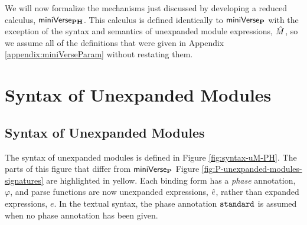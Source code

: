 {\else 

We will now formalize the mechanisms just discussed by developing a reduced calculus, $\mathsf{miniVerse}_\textbf{PH}$. This calculus is defined identically to $\mathsf{miniVerse}_\textbf{P}$ with the exception of the syntax and semantics of unexpanded module expressions, ${\hat M}$, so we assume all of the definitions that were given in Appendix \ref{appendix:miniVerseParam} without restating them. 

\fi

\ificfp
\section{Syntax of Unexpanded Modules}
\else
\subsection{Syntax of Unexpanded Modules}
\fi
The syntax of unexpanded modules is defined in Figure \ref{fig:syntax-uM-PH}. The parts of this figure that differ from \ificfp $\mathsf{miniVerse}_\textbf{P}$ \else Figure \ref{fig:P-unexpanded-modules-signatures} \fi are highlighted in yellow. Each binding form has a \emph{phase} annotation, $\varphi$, and parse functions are now unexpanded expressions, ${\hat e}$, rather than expanded expressions, $e$. In the textual syntax, the phase annotation $\texttt{standard}$ is assumed when no phase annotation has been given.

}
